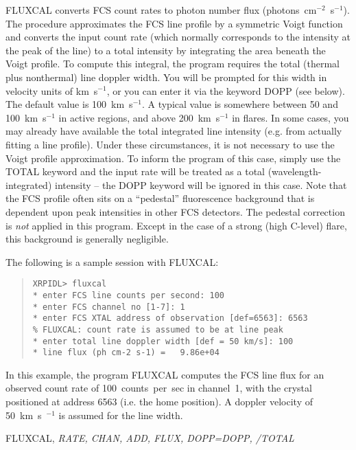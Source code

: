 {{{FLUXCAL converts FCS count rates  to photon number flux
\hbox{(photons~cm$^{-2}$~s$^{-1}$)}. The procedure approximates the FCS line  profile
by a symmetric Voigt function and converts the input count rate (which
normally corresponds to the intensity at the peak of the line) to a total
intensity  by integrating the area beneath the Voigt profile.  To compute this
integral,  the program requires the total (thermal plus nonthermal) line
doppler width. You will be prompted for this width in velocity units of
km~s$^{-1}$, or you can enter it via the keyword DOPP (see below). The default
value is 100~km~s$^{-1}$.  A  typical value is somewhere between 50 and
100~km~s$^{-1}$ in active regions, and  above 200~km~s$^{-1}$ in flares. In
some cases, you may already have available  the total integrated line intensity
(e.g.\/ from actually fitting a line  profile). Under these circumstances, it is
not necessary to use the Voigt  profile approximation. To inform the program of
this case, simply use the TOTAL keyword  and the input rate will be treated as
a total  (wavelength-integrated) intensity -- the DOPP keyword will be ignored
in this case. Note that the FCS profile often sits on a ``pedestal''
fluorescence background that is dependent upon peak intensities in other FCS
detectors. The pedestal correction is {\it not} applied in this program. Except
in the case of a strong (high C-level) flare, this background is generally
negligible.

The following is a sample session with FLUXCAL:
\begin{quote}
\begin{verbatim}
XRPIDL> fluxcal
* enter FCS line counts per second: 100
* enter FCS channel no [1-7]: 1
* enter FCS XTAL address of observation [def=6563]: 6563
% FLUXCAL: count rate is assumed to be at line peak
* enter total line doppler width [def = 50 km/s]: 100
* line flux (ph cm-2 s-1) =   9.86e+04
\end{verbatim}
\end{quote}
In this example, the program FLUXCAL computes the FCS line flux
for an observed count rate of 100~counts~per~sec in channel~1, with
the crystal positioned at address 6563 (i.e. the home position).
A doppler velocity of 50~km~s~$^{-1}$ is assumed for the line width.


FLUXCAL, {\it RATE, CHAN, ADD, FLUX, DOPP=DOPP, /TOTAL}


}}}

